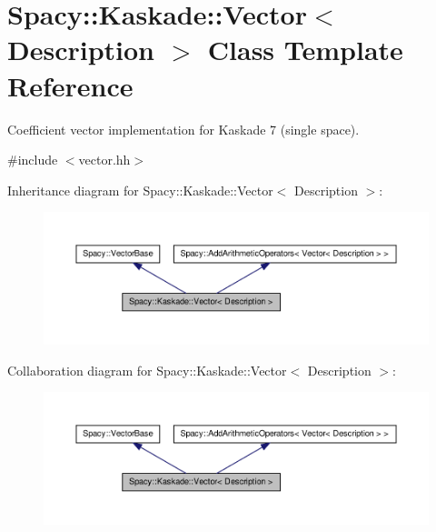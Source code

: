 \hypertarget{classSpacy_1_1Kaskade_1_1Vector}{\section{\-Spacy\-:\-:\-Kaskade\-:\-:\-Vector$<$ \-Description $>$ \-Class \-Template \-Reference}
\label{classSpacy_1_1Kaskade_1_1Vector}
}


\-Coefficient vector implementation for \-Kaskade 7 (single space).  




{\ttfamily \#include $<$vector.\-hh$>$}



\-Inheritance diagram for \-Spacy\-:\-:\-Kaskade\-:\-:\-Vector$<$ \-Description $>$\-:
\nopagebreak
\begin{figure}[H]
\begin{center}
\leavevmode
\includegraphics[width=350pt]{classSpacy_1_1Kaskade_1_1Vector__inherit__graph}
\end{center}
\end{figure}


\-Collaboration diagram for \-Spacy\-:\-:\-Kaskade\-:\-:\-Vector$<$ \-Description $>$\-:
\nopagebreak
\begin{figure}[H]
\begin{center}
\leavevmode
\includegraphics[width=350pt]{classSpacy_1_1Kaskade_1_1Vector__coll__graph}
\end{center}
\end{figure}
